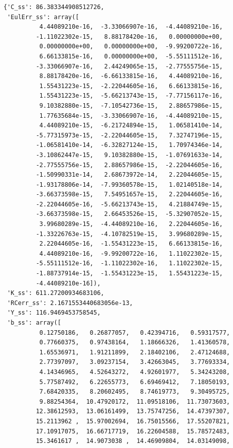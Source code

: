 \documentclass[letterpaper,12pt]{article}
\theoremstyle{definition}
\begin{document}
\begin{enumerate}
\begin{enumerate}[(a)]
\begin{verbatim}
{'C_ss': 86.383344908512726,
 'EulErr_ss': array([  
          4.44089210e-16,  -3.33066907e-16,  -4.44089210e-16,
         -1.11022302e-15,   8.88178420e-16,   0.00000000e+00,
          0.00000000e+00,   0.00000000e+00,  -9.99200722e-16,
          6.66133815e-16,   0.00000000e+00,  -5.55111512e-16,
         -3.33066907e-16,   2.44249065e-15,  -2.77555756e-15,
          8.88178420e-16,  -6.66133815e-16,   4.44089210e-16,
          1.55431223e-15,  -2.22044605e-16,   6.66133815e-16,
          1.55431223e-15,  -5.66213743e-15,  -7.77156117e-16,
          9.10382880e-15,  -7.10542736e-15,   2.88657986e-15,
          1.77635684e-15,  -3.33066907e-16,  -4.44089210e-15,
          4.44089210e-15,  -6.21724894e-15,   1.06581410e-14,
         -5.77315973e-15,  -2.22044605e-15,   7.32747196e-15,
         -1.06581410e-14,  -6.32827124e-15,   1.70974346e-14,
         -3.10862447e-15,   9.10382880e-15,  -1.07691633e-14,
         -2.77555756e-15,   2.88657986e-15,  -2.22044605e-16,
         -1.50990331e-14,   2.68673972e-14,   2.22044605e-15,
         -1.93178806e-14,  -7.99360578e-15,   1.02140518e-14,
         -3.66373598e-15,   7.54951657e-15,   2.22044605e-16,
         -2.22044605e-16,  -5.66213743e-15,   4.21884749e-15,
         -3.66373598e-15,   2.66453526e-15,  -5.32907052e-15,
          3.99680289e-15,  -4.44089210e-16,   2.22044605e-16,
         -1.33226763e-15,  -4.10782519e-15,   3.99680289e-15,
          2.22044605e-16,  -1.55431223e-15,   6.66133815e-16,
          4.44089210e-16,  -9.99200722e-16,   1.11022302e-15,
         -5.55111512e-16,  -1.11022302e-16,   1.11022302e-15,
         -1.88737914e-15,  -1.55431223e-15,   1.55431223e-15,
         -4.44089210e-16]),
 'K_ss': 611.27200934683106,
 'RCerr_ss': 2.1671553440683056e-13,
 'Y_ss': 116.9469453758545,
 'b_ss': array([ 
          0.12750186,   0.26877057,   0.42394716,   0.59317577,
          0.77660375,   0.97438164,   1.18666326,   1.41360578,
          1.65536971,   1.91211899,   2.18402106,   2.47124688,
          2.77397097,   3.09237154,   3.42663045,   3.77693334,
          4.14346965,   4.52643272,   4.92601977,   5.34243208,
          5.77587492,   6.22655773,   6.69469412,   7.18050193,
          7.68420335,   8.20602495,   8.74619773,   9.30495725,
          9.88254364,  10.47920172,  11.09518106,  11.73073603,
         12.38612593,  13.06161499,  13.75747256,  14.47397307,
         15.2113962 ,  15.97002694,  16.75015566,  17.55207821,
         17.10917075,  16.66717719,  16.22604588,  15.78572483,
         15.3461617 ,  14.9073038 ,  14.46909804,  14.03149098,

\end{verbatim}
\end{enumerate}
\end{enumerate}
\end{document}

